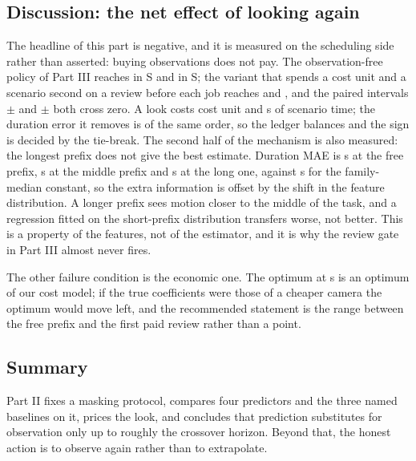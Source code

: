 \documentclass{swmcmthesis}
\begin{document}
\subsection{Discussion: the net effect of looking again}
\label{sec:p2disc}

The headline of this part is negative, and it is measured on the scheduling side
rather than asserted: buying observations does not pay. The observation-free policy
of Part III reaches \slotPStochSTwoSlackOldETA{} in S\slotCaseTwo{} and
\slotPStochSThreeSlackOldETA{} in S\slotCaseThree{}; the variant that spends a cost
unit and a scenario second on a review before each job reaches
\slotPStochSTwoRiskFusionETA{} and \slotPStochSThreeRiskFusionETA{}, and the paired
intervals \slotPStochPairSTwoRiskFusionDiff{}$\pm$\slotPStochPairSTwoRiskFusionCI{}
and \slotPStochPairSThreeRiskFusionDiff{}$\pm$\slotPStochPairSThreeRiskFusionCI{}
both cross zero. A look costs \slotReviewCost{} cost unit and \slotReviewDelay{} s of
scenario time; the duration error it removes is of the same order, so the ledger
balances and the sign is decided by the tie-break. The second half of the mechanism
is also measured: the longest prefix does not give the best estimate. Duration MAE is
\slotPDurFreeMAE{} s at the free prefix, \slotPDurMidMAE{} s at the middle prefix and
\slotPDurLongMAE{} s at the long one, against \slotPDurFreeBaseMAE{} s for the
family-median constant, so the extra information is offset by the shift in the
feature distribution. A longer prefix sees motion closer to the middle of the task,
and a regression fitted on the short-prefix distribution transfers worse, not better.
This is a property of the features, not of the estimator, and it is why the review
gate in Part III almost never fires.

The other failure condition is the economic one. The optimum at
\slotPEconOptT{} s is an optimum of our cost model; if the true coefficients were
those of a cheaper camera the optimum would move left, and the recommended
statement is the range between the free prefix and the first paid review rather
than a point.

\subsection{Summary}

Part II fixes a masking protocol, compares four predictors and the three named
baselines on it, prices the look, and concludes that prediction substitutes for
observation only up to roughly the crossover horizon. Beyond that, the honest
action is to observe again rather than to extrapolate.
\end{document}
